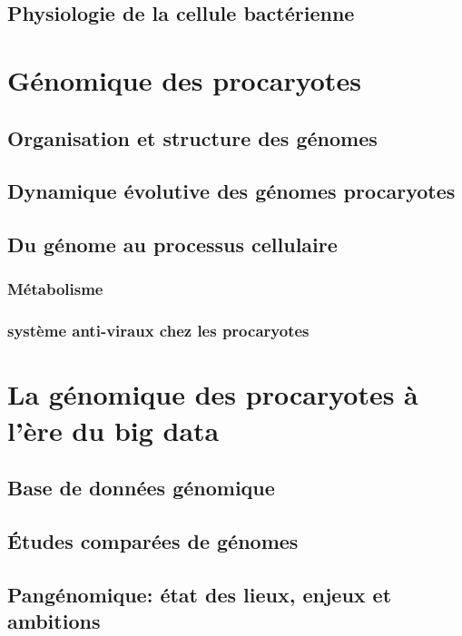 \section{Physiologie de la cellule bactérienne}

\chapter{Génomique des procaryotes}
\section{Organisation et structure des génomes}
\section{Dynamique évolutive des génomes procaryotes}
\section{Du génome au processus cellulaire}
\subsection{Métabolisme}
\subsection{système anti-viraux chez les procaryotes}
\chapter{La génomique des procaryotes à l'ère du big data}
\section{Base de données génomique}
\section{Études comparées de génomes}
\section{Pangénomique: état des lieux, enjeux et ambitions}